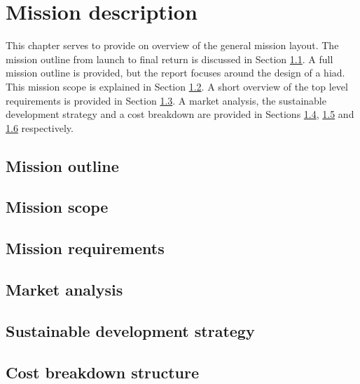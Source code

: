 \section{Mission description}\label{cha:missiondescr}

This chapter serves to provide on overview of the general mission layout. The mission outline from launch to final return is discussed in Section \ref{sec:missionoutline}. A full mission outline is provided, but the report focuses around the design of a \gls{hiad}. This mission scope is explained in Section \ref{sec:missionscope}. A short overview of the top level requirements is provided in Section \ref{sec:missionreq}. A market analysis, the sustainable development strategy and a cost breakdown are provided in Sections \ref{sec:marketanalysis}, \ref{sec:sustainable} and \ref{sec:costbreakdown} respectively. 

\subsection{Mission outline} \label{sec:missionoutline}


\subsection{Mission scope} \label{sec:missionscope}


\subsection{Mission requirements} \label{sec:missionreq}


\subsection{Market analysis} \label{sec:marketanalysis}


\subsection{Sustainable development strategy} \label{sec:sustainable}


\subsection{Cost breakdown structure} \label{sec:costbreakdown}


%

